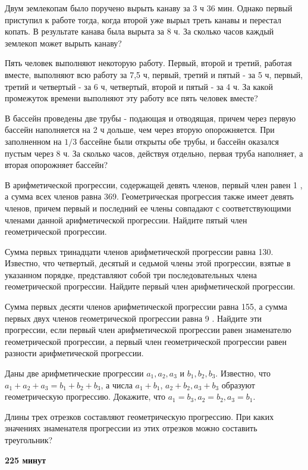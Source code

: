 \newpage


 Двум землекопам было поручено вырыть канаву за 3 ч 36 мин. Однако первый приступил к работе тогда, когда второй уже вырыл треть канавы и перестал копать. В результате канава была вырыта за 8 ч. За сколько часов каждый землекоп может вырыть канаву?

 Пять человек выполняют некоторую работу. Первый, второй и третий, работая вместе, выполняют всю работу за 7,5 ч, первый, третий и пятый - за 5 ч, первый, третий и четвертый - за 6 ч, четвертый, второй и пятый - за 4 ч. За какой промежуток времени выполняют эту работу все пять человек вместе?

 В бассейн проведены две трубы - подающая и отводящая, причем через первую бассейн наполняется на 2 ч дольше, чем через вторую опорожняется. При заполненном на $1 / 3$ бассейне были открыты обе трубы, и бассейн оказался пустым через 8 ч. За сколько часов, действуя отдельно, первая труба наполняет, а вторая опорожняет бассейн?

 В арифметической прогрессии, содержащей девять членов, первый член равен 1 , а сумма всех членов равна 369. Геометрическая прогрессия также имеет девять членов, причем первый и последний ее члены совпадают с соответствующими членами данной арифметической прогрессии. Найдите пятый член геометрической прогрессии.

 Сумма первых тринадцати членов арифметической прогрессии равна 130. Известно, что четвертый, десятый и седьмой члены этой прогрессии, взятые в указанном порядке, представляют собой три последовательных члена геометрической прогрессии. Найдите первый член арифметической прогрессии.

 Сумма первых десяти членов арифметической прогрессии равна 155, а сумма первых двух членов геометрической прогрессии равна 9 . Найдите эти прогрессии, если первый член арифметической прогрессии равен знаменателю геометрической прогрессии, а первый член геометрической прогрессии равен разности арифметической прогрессии.

 Даны две арифметические прогрессии $a_1, a_2, a_3$ и $b_1, b_2, b_3$. Известно, что $a_1+a_2+a_3=b_1+b_2+b_3$, а числа $a_1+b_1$, $a_2+b_2, a_3+b_3$ образуют геометрическую прогрессию. Докажите, что $a_1=b_3, a_2=b_2, a_3=b_1$.

 Длины трех отрезков составляют геометрическую прогрессию. При каких значениях знаменателя прогрессии из этих отрезков можно составить треугольник?\\

\centerline{\textbf{225 минут}}
